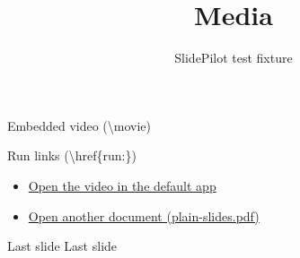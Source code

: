 \documentclass{beamer}
\title{Media}
\subtitle{SlidePilot test fixture}
\begin{document}
\begin{frame}
  \titlepage
\end{frame}

\begin{frame}{Embedded video (\textbackslash movie)}
  \centering
\end{frame}

\begin{frame}{Run links (\textbackslash href\{run:\})}
  \begin{itemize}
    \item \href{run:media/test-pattern.mp4}{Open the video in the default app}
    \item \href{run:plain-slides.pdf}{Open another document (plain-slides.pdf)}
  \end{itemize}
\end{frame}

\begin{frame}{Last slide}
  \centering
  \Large Last slide
\end{frame}
\end{document}
